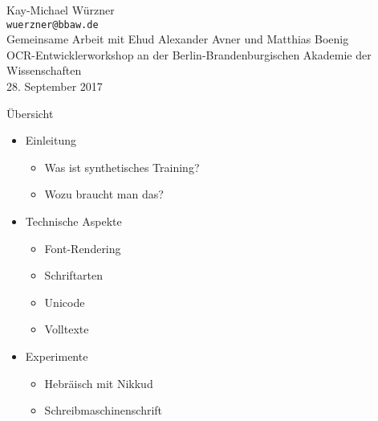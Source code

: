 \documentclass{bbawslides}
\begin{document}
\providecommand{\Title}{}


\begin{bbawtitle}
  \vspace*{2em}%
  Kay-Michael Würzner\\[-.25em]%
  \textcolor{urlColor}{\texttt{{\small wuerzner@bbaw.de}}}
  \\[0.5em]
  {\small Gemeinsame Arbeit mit Ehud Alexander Avner und Matthias Boenig}
  \\[1.5em]
  {\footnotesize{%
    OCR-Entwicklerworkshop an der Berlin-Brandenburgischen Akademie der Wissenschaften\\%
    28. September 2017\\%
  }}
\end{bbawtitle}
\slideStyleFrame

\renewcommand{\footerText}{\tiny 28. September 2017, OCR-Entwicklerworkshop, BBAW}

\begin{bbawslide}{Übersicht}
  \vspace*{7mm}%
  \centerslidestrue%
  \begin{itemize}
    \item Einleitung
    \begin{itemize}\small
      \item Was ist synthetisches Training?
      \item Wozu braucht man das?
    \end{itemize}
    \item Technische Aspekte
    \begin{itemize}\small
      \item Font-Rendering
      \item Schriftarten
      \item Unicode
      \item Volltexte
    \end{itemize}
    \item Experimente
    \begin{itemize}\small
      \item Hebräisch mit Nikkud
      \item Schreibmaschinenschrift
    \end{itemize}
  \end{itemize}
\end{bbawslide}
\end{document}
